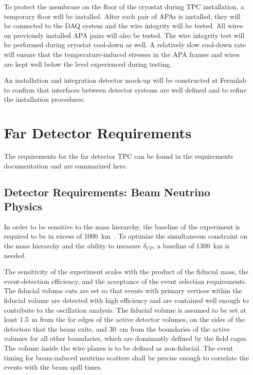 To protect the membrane on the floor of the cryostat during TPC installation, a temporary floor will be installed. After each pair of APAs is installed, they will be connected to the DAQ system and the wire integrity will be tested. All wires on previously installed APA pairs will also be tested. The wire integrity test will be performed during cryostat cool-down as well. A relatively slow cool-down rate will ensure that the temperature-induced stresses in the APA frames and wires are kept well below the level experienced during testing. 

An installation and integration detector mock-up will be constructed at Fermilab to confirm that interfaces between detector systems are well defined and to refine the installation procedures. 



\section{Far Detector Requirements}

The requirements for the far detector TPC can be found in the requirements documentation \cite{lar-fd-req} and are summarized here.  

\subsection{Detector Requirements: Beam Neutrino Physics}

In order to be sensitive to the mass hierarchy, the baseline of the
experiment is required to be in excess of
1000~km~\cite{sci-opp,baselineprd}.  To optimize the simultaneous
constraint on the mass hierarchy and the ability to measure
$\delta_{CP}$, a baseline of 1300~km is needed.

The sensitivity of the experiment scales with the product of the
fiducial mass, the event-detection efficiency, and the acceptance of
the event selection requirements.  The fiducial volume cuts are set so
that events with primary vertices within the fiducial volume are
detected with high efficiency and are contained well enough to
contribute to the oscillation analysis.  The fiducial volume is
assumed to be set at least 1.5~m from the far edges of the active
detector volumes, on the sides of the detectors that the beam exits,
and 30~cm from the boundaries of the active volumes for all other
boundaries,  which are dominantly defined by the field cages.  The
volume inside the wire planes is to be defined as non-fiducial.
The event timing for beam-induced neutrino scatters
shall be precise enough to correlate the events with the
beam spill times.  %

